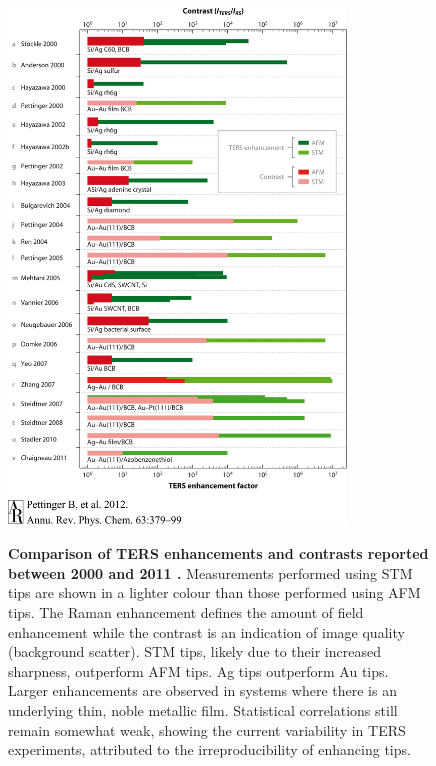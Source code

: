 \documentclass{article}
\begin{document}
\begin{figure}
\centering
{\includegraphics[width=0.8\textwidth, clip=true, trim=0 35 0 0]{figures/literature/pc630379_f8}}
{\caption[Comparison of TERS enhancements and contrasts reported between 2000 and 2011 \cite{pettinger2012}]{\textbf{Comparison of TERS enhancements and contrasts reported between 2000 and 2011 \cite{pettinger2012}.} Measurements performed using STM tips are shown in a lighter colour than those performed using AFM tips. {\color{red}The Raman enhancement defines the amount of field enhancement while the contrast is an indication of image quality (background scatter).} STM tips, likely due to their increased sharpness, outperform AFM tips. Ag tips outperform Au tips. Larger enhancements are observed in systems where there is an underlying thin, noble metallic film. Statistical correlations still remain somewhat weak, showing the current variability in TERS experiments, attributed to the irreproducibility of enhancing tips.}
\label{fig:pettinger2012}}
\end{figure}
\end{document}
